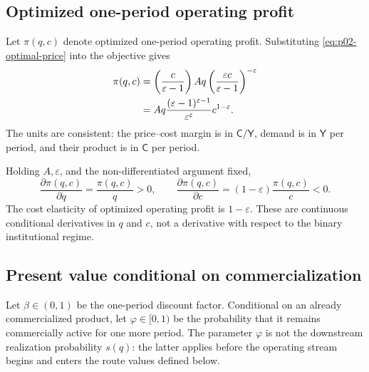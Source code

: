 \subsection{Optimized one-period operating profit}
\label{subsec:p02-operating-profit}

Let \(\pi(q,c)\) denote optimized one-period operating profit.
Substituting \eqref{eq:p02-optimal-price} into the objective gives
\begin{align}
  \pi(q,c)
  &=\left(\frac{c}{\varepsilon-1}\right)
    Aq\left(\frac{\varepsilon c}{\varepsilon-1}\right)^{-\varepsilon}
    \notag\\
  &=Aq
    \frac{(\varepsilon-1)^{\varepsilon-1}}
         {\varepsilon^{\varepsilon}}
    c^{1-\varepsilon}.
  \label{eq:p02-operating-profit}
\end{align}
The units are consistent: the price--cost margin is in
\(\mathsf C/\mathsf Y\), demand is in \(\mathsf Y\) per period, and their
product is in \(\mathsf C\) per period.

Holding \(A,\varepsilon\), and the non-differentiated argument fixed,
\begin{equation}
  \frac{\partial\pi(q,c)}{\partial q}
  =\frac{\pi(q,c)}{q}>0,
  \qquad
  \frac{\partial\pi(q,c)}{\partial c}
  =(1-\varepsilon)\frac{\pi(q,c)}{c}<0.
  \label{eq:p02-profit-derivatives}
\end{equation}
The cost elasticity of optimized operating profit is \(1-\varepsilon\).
These are continuous conditional derivatives in \(q\) and \(c\), not a
derivative with respect to the binary institutional regime.

\subsection{Present value conditional on commercialization}
\label{subsec:p02-present-value}

Let \(\beta\in(0,1)\) be the one-period discount factor. Conditional on an
already commercialized product, let \(\varphi\in[0,1)\) be the probability
that it remains commercially active for one more period. The parameter
\(\varphi\) is not the downstream realization probability \(s(q)\): the
latter applies before the operating stream begins and enters the route values
defined below.

